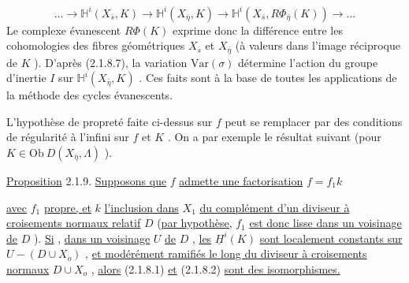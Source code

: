 \begin{equation}\tag{2.1.8.9}
\ldots \longrightarrow \mathbb{H}^i(X_{\bar{s}}, K) \longrightarrow \mathbb{H}^i(X_{\bar{\eta}}, K) \longrightarrow \mathbb{H}^i(X_{\bar{s}}, R\Phi_{\bar{\eta}}(K)) \longrightarrow \ldots
\end{equation}
Le complexe évanescent $R\Phi(K)$ exprime donc la différence entre les cohomologies des fibres géométriques $X_{\bar{s}}$ et $X_{\bar{\eta}}$ (à valeurs dans l'image réciproque de $K$ ). D'après (2.1.8.7), la variation $\mathrm{Var}(\sigma)$ détermine l'action du groupe d'inertie $I$
sur $\mathbb{H}^i(X_{\bar\eta}, K)$ . Ces faits sont à la base de toutes les applications de la méthode des cycles évanescents.

L'hypothèse de propreté faite ci-dessus sur $f$ peut se remplacer par des conditions de régularité à l'infini sur $f$ et $K$ . On a par exemple le résultat suivant (pour $K \in \mathrm{Ob}\ D(X_{\bar\eta}, \Lambda)$ ).

\underline{Proposition} 2.1.9. \underline{Supposons que} $f$ \underline{admette une factorisation} $f = f_1k$

\begin{center}
\end{center}
\underline{avec} $f_1$ \underline{propre, et} $k$ \underline{l'inclusion dans} $X_1$ \underline{du complément d'un diviseur à croisements normaux relatif} $D$ (\underline{par hypothèse,} $f_1$ \underline{est donc lisse dans un voisinage de} $D$ ). \underline{Si} , \underline{dans un voisinage} $U$ \underline{de} $D$ , \underline{les} $\underline{H}^i(K)$ \underline{sont localement constants sur} $U-(D \cup X_o)$ , \underline{et modérément ramifiés le long du diviseur à croisements normaux} $D \cup X_o$ , \underline{alors} (2.1.8.1) \underline{et} (2.1.8.2) \underline{sont des isomorphismes.}

